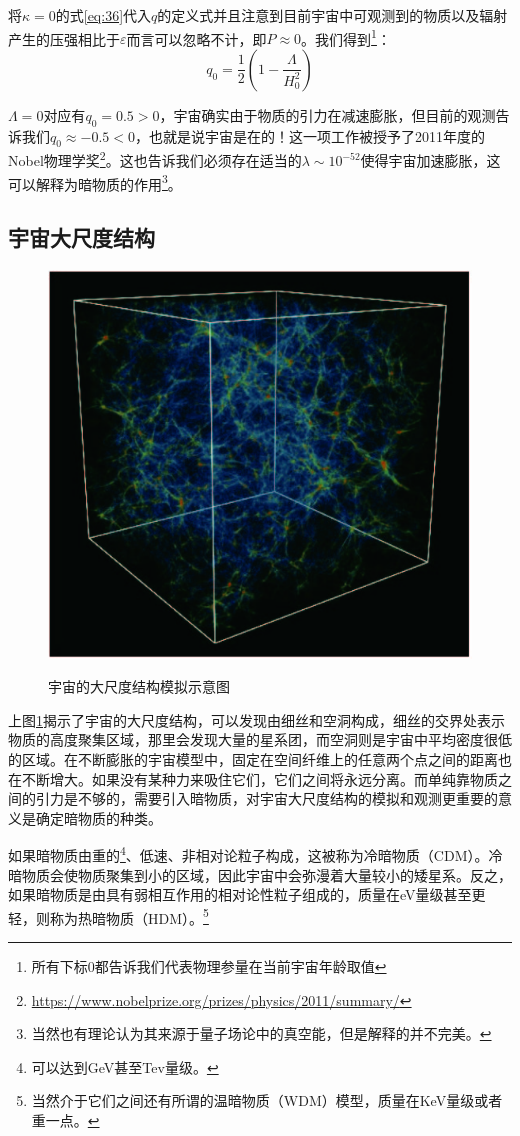 \documentclass{ctexart}
\newcommand{\dotemph}[1]{\CJKunderdot{#1}}
\begin{document}
	将$\kappa=0$的式\ref{eq:36}代入$q$的定义式并且注意到目前宇宙中可观测到的物质以及辐射产生的压强相比于$\varepsilon$而言可以忽略不计，即$P\approx 0$。我们得到\footnote{所有下标0都告诉我们代表物理参量在当前宇宙年龄取值}：
	\begin{equation}
		q_0=\frac{1}{2}\left(1-\frac{\Lambda}{H_0^2}\right)
	\end{equation}

	$\Lambda=0$对应有$q_0=0.5>0$，宇宙确实由于物质的引力在减速膨胀，但目前的观测\cite{Riess_1998}\cite{Perlmutter_1999}告诉我们$q_0\approx-0.5<0$，也就是说宇宙是在\dotemph{加速膨胀}的！这一项工作被授予了2011年度的Nobel物理学奖\footnote{\href{https://www.nobelprize.org/prizes/physics/2011/summary/}{https://www.nobelprize.org/prizes/physics/2011/summary/}}。这也告诉我们必须存在适当的$\lambda\sim 10^{-52}$使得宇宙加速膨胀，这可以解释为暗物质的作用\footnote{当然也有理论认为其来源于量子场论中的真空能，但是解释的并不完美。}。
	\subsection{宇宙大尺度结构}
	\begin{figure}[h]
		\centering
		\includegraphics[width=.5\linewidth]{figs/fig4.jpg}
		\label{fig:4}
		\caption[]{宇宙的大尺度结构模拟示意图}
	\end{figure}
	
	上图\ref{fig:4}揭示了宇宙的大尺度结构，可以发现由细丝和空洞构成，细丝的交界处表示物质的高度聚集区域，那里会发现大量的星系团，而空洞则是宇宙中平均密度很低的区域。在不断膨胀的宇宙模型中，固定在空间纤维上的任意两个点之间的距离也在不断增大。如果没有某种力来吸住它们，它们之间将永远分离。而单纯靠物质之间的引力是不够的，需要引入暗物质，对宇宙大尺度结构的模拟和观测更重要的意义是确定暗物质的种类。
	
	如果暗物质由重的\footnote{可以达到GeV甚至Tev量级。}、低速、非相对论粒子构成，这被称为冷暗物质（CDM）。冷暗物质会使物质聚集到小的区域，因此宇宙中会弥漫着大量较小的矮星系。反之，如果暗物质是由具有弱相互作用的相对论性粒子组成的，质量在eV量级甚至更轻，则称为热暗物质（HDM）。\footnote{当然介于它们之间还有所谓的温暗物质（WDM）模型，质量在KeV量级或者重一点。}
	
\end{document}
